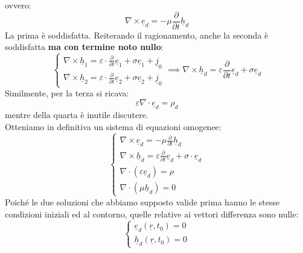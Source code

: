 \documentclass{book}
\begin{document}
        ovvero:
        \begin{equation}
            \nabla \times \underline{e}_{d} = - \mu \frac{\partial}{\partial t} \underline{h}_{d}
        \end{equation}
        La prima è soddisfatta. Reiterando il ragionamento, anche la seconda è soddisfatta \textbf{ma con termine noto nullo}:
        \begin{equation}
        \begin{cases}
            \nabla \times \underline{h}_{1} = \displaystyle \varepsilon \cdot \frac{\partial}{\partial t} \underline{e}_{1} + \sigma \underline{e}_{1} + \underline{j}_{0} \\
            
            \nabla \times \underline{h}_{2} = \displaystyle \varepsilon \cdot \frac{\partial}{\partial t} \underline{e}_{2} + \sigma \underline{e}_{2} + \underline{j}_{0}
        \end{cases} \implies \nabla  \times \underline{h}_{d} = \varepsilon \frac{\partial}{\partial t} \underline{e}_{d} + \sigma \underline{e}_{d}
        \end{equation}
        Similmente, per la terza si ricava:
        \begin{equation}
            \varepsilon \nabla \cdot \underline{e}_{d} = \rho_{d}
        \end{equation}
        mentre della quarta è inutile discutere. \\
        Otteniamo in definitiva un sistema di equazioni omogenee:
        \begin{equation}
        \begin{cases}
            \nabla \times \underline{e}_{d} = - \displaystyle \mu \frac{\partial}{\partial t} \underline{h}_{d} \\
            \nabla \times \underline{h}_{d} = \displaystyle \varepsilon \frac{\partial}{\partial t} \underline{e}_{d}+\sigma \cdot \underline{e}_{d} \\
            \nabla \cdot (\varepsilon \underline{e}_{d}) = \rho \\
            \nabla \cdot (\mu \underline{h}_{d} )= 0
        \end{cases}
        \end{equation}
        Poiché le due soluzioni che abbiamo supposto valide prima hanno le stesse condizioni iniziali ed al contorno, quelle relative ai vettori differenza sono nulle:
        \begin{equation}
            \begin{cases}
                \underline{e}_{d} (\underline{r},t_{0}) = 0 \\
                \underline{h}_{d} (\underline{r},t_{0})=0
            \end{cases}
        \end{equation}
\end{document}
